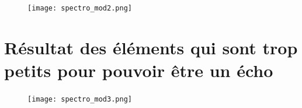 \documentclass[11pt]{article}
\begin{document}
\begin{figure}[H]
    \begin{center}
        \texttt{[image: spectro\_mod2.png]}
    \end{center}
\end{figure}

\newpage

\section{Résultat des éléments qui sont trop petits pour pouvoir être un écho}

\begin{figure}[h]
    \begin{center}
        \texttt{[image: spectro\_mod3.png]}
    \end{center}
\end{figure}








\end{document}
